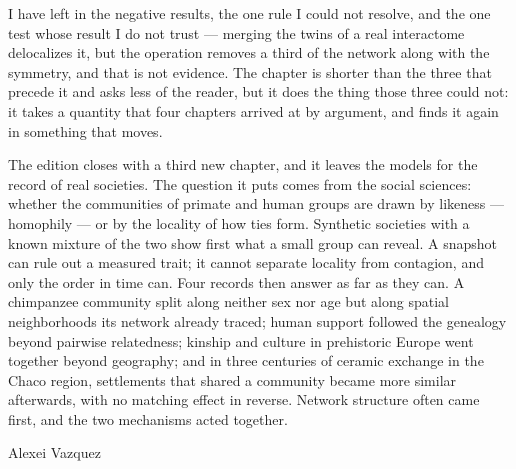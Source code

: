 \documentclass[10pt]{book}
\begin{document}
I have left in the negative results, the one rule I could not resolve, and the one test
whose result I do not trust --- merging the twins of a real interactome delocalizes it,
but the operation removes a third of the network along with the symmetry, and that is
not evidence. The chapter is shorter than the three that precede it and asks less of the
reader, but it does the thing those three could not: it takes a quantity that four
chapters arrived at by argument, and finds it again in something that moves.

The edition closes with a third new chapter, and it leaves the models for the record of
real societies. The question it puts comes from the social sciences:
whether the communities of primate and human groups are drawn by likeness --- homophily
--- or by the locality of how ties form. Synthetic societies with a known mixture of the
two show first what a small group can reveal. A snapshot can rule out a measured trait;
it cannot separate locality from contagion, and only the order in time can. Four records
then answer as far as they can. A chimpanzee community split along neither sex nor age
but along spatial neighborhoods its network already traced; human support followed the
genealogy beyond pairwise relatedness; kinship and culture in prehistoric Europe went
together beyond geography; and in three centuries of ceramic exchange in the Chaco
region, settlements that shared a community became more similar afterwards, with no
matching effect in reverse. Network structure often came first, and the two mechanisms
acted together.

\vspace{1em}
\noindent Alexei Vazquez

\tableofcontents










\end{document}
